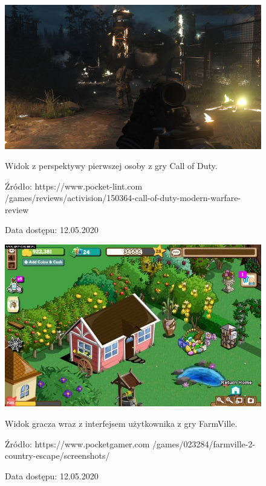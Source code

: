 \begin{figure}[ht]
    \centering
    \begin{minipage}{0.45\textwidth}
        \centering
        \includegraphics[width=1\textwidth]{images/cod.jpg} %
        \caption{Widok z perspektywy pierwszej osoby z gry Call of Duty.}
        \caption*{Źródło: https://www.pocket-lint.com /games/reviews/activision/150364-call-of-duty-modern-warfare-review}
        \caption*{Data dostępu: 12.05.2020}
        \label{fig:cod}
    \end{minipage}\hfill
    \begin{minipage}{0.45\textwidth}
        \centering
        \includegraphics[width=1\textwidth]{images/farm.jpg} %
        \caption{Widok gracza wraz z interfejsem użytkownika z gry FarmVille.}
        \caption*{Źródło: https://www.pocketgamer.com /games/023284/farmville-2-country-escape/screenshots/}
        \caption*{Data dostępu: 12.05.2020}
        \label{fig:farm}
    \end{minipage}
\end{figure}

